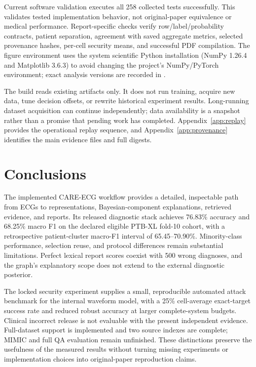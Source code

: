 Current software validation executes all 258 collected tests successfully. This validates tested implementation behavior, not original-paper equivalence or medical performance. Report-specific checks verify row/label/probability contracts, patient separation, agreement with saved aggregate metrics, selected provenance hashes, per-cell security means, and successful PDF compilation. The figure environment uses the system scientific Python installation (NumPy 1.26.4 and Matplotlib 3.6.3) to avoid changing the project's NumPy/PyTorch environment; exact analysis versions are recorded in .

The build reads existing artifacts only. It does not run training, acquire new data, tune decision offsets, or rewrite historical experiment results. Long-running dataset acquisition can continue independently; data availability is a snapshot rather than a promise that pending work has completed. Appendix~\ref{app:replay} provides the operational replay sequence, and Appendix~\ref{app:provenance} identifies the main evidence files and full digests.

\section{Conclusions}
The implemented CARE-ECG workflow provides a detailed, inspectable path from ECGs to representations, Bayesian-component explanations, retrieved evidence, and reports. Its released diagnostic stack achieves 76.83\% accuracy and 68.25\% macro F1 on the declared eligible PTB-XL fold-10 cohort, with a retrospective patient-cluster macro-F1 interval of 65.45--70.90\%. Minority-class performance, selection reuse, and protocol differences remain substantial limitations. Perfect lexical report scores coexist with 500 wrong diagnoses, and the graph's explanatory scope does not extend to the external diagnostic posterior.

The locked security experiment supplies a small, reproducible automated attack benchmark for the internal waveform model, with a 25\% cell-average exact-target success rate and reduced robust accuracy at larger complete-system budgets. Clinical incorrect release is not evaluable with the present independent evidence. Full-dataset support is implemented and two source indexes are complete; MIMIC and full QA evaluation remain unfinished. These distinctions preserve the usefulness of the measured results without turning missing experiments or implementation choices into original-paper reproduction claims.

\clearpage
